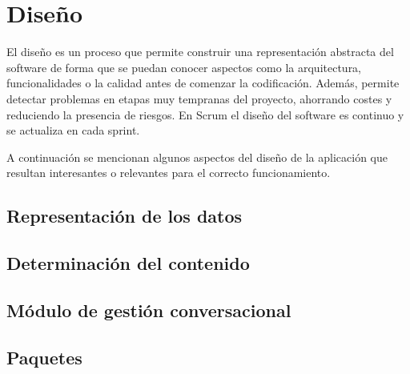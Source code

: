 \section{Diseño}

El diseño es un proceso que permite construir una representación abstracta del software de forma que se puedan conocer aspectos como la arquitectura, funcionalidades o la calidad antes de comenzar la codificación. Además, permite detectar problemas en etapas muy tempranas del proyecto, ahorrando costes y reduciendo la presencia de riesgos. En Scrum el diseño del software es continuo y se actualiza en cada sprint.

A continuación se mencionan algunos aspectos del diseño de la aplicación que resultan interesantes o relevantes para el correcto funcionamiento.

\subsection{Representación de los datos}
\subsection{Determinación del contenido}
\subsection{Módulo de gestión conversacional}
\subsection{Paquetes}